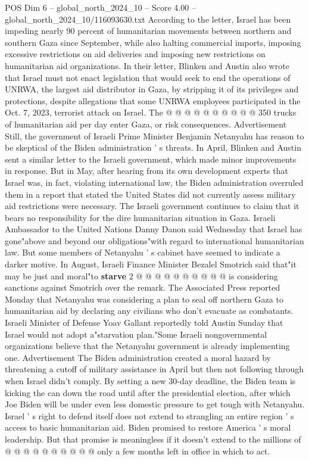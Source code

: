 \begin{textsample}{POS Dim 6 – global\_north\_2024\_10 – Score 4.00 – global\_north\_2024\_10/116093630.txt}
According to the letter, Israel has been impeding nearly 90 percent of humanitarian movements between northern and southern Gaza since September, while also halting commercial imports, imposing excessive restrictions on aid deliveries and imposing new restrictions on humanitarian aid organizations.
In their letter, Blinken and Austin also wrote that Israel must not enact legislation that would seek to end the operations of UNRWA, the largest aid distributor in Gaza, by stripping it of its privileges and protections, despite allegations that some UNRWA employees participated in the Oct. 7, 2023, terrorist attack on Israel.
The @ @ @ @ @ @ @ @ @ @ 350 trucks of humanitarian aid per day enter Gaza, or risk consequences.
Advertisement Still, the government of Israeli Prime Minister Benjamin Netanyahu has reason to be skeptical of the Biden administration ' s threats.
In April, Blinken and Austin sent a similar letter to the Israeli government, which made minor improvements in response.
But in May, after hearing from its own development experts that Israel was, in fact, violating international law, the Biden administration overruled them in a report that stated the United States did not currently assess military aid restrictions were necessary.
The Israeli government continues to claim that it bears no responsibility for the dire humanitarian situation in Gaza.
Israeli Ambassador to the United Nations Danny Danon said Wednesday that Israel has gone"above and beyond our obligations"with regard to international humanitarian law.
But some members of Netanyahu ' s cabinet have seemed to indicate a darker motive.
In August, Israeli Finance Minister Bezalel Smotrich said that"it may be just and moral"to \textbf{starve} 2 @ @ @ @ @ @ @ @ @ @ is considering sanctions against Smotrich over the remark.
The Associated Press reported Monday that Netanyahu was considering a plan to seal off northern Gaza to humanitarian aid by declaring any civilians who don't evacuate as combatants.
Israeli Minister of Defense Yoav Gallant reportedly told Austin Sunday that Israel would not adopt a"starvation plan."Some Israeli nongovernmental organizations believe that the Netanyahu government is already implementing one.
Advertisement The Biden administration created a moral hazard by threatening a cutoff of military assistance in April but then not following through when Israel didn't comply.
By setting a new 30-day deadline, the Biden team is kicking the can down the road until after the presidential election, after which Joe Biden will be under even less domestic pressure to get tough with Netanyahu.
Israel ' s right to defend itself does not extend to strangling an entire region ' s access to basic humanitarian aid.
Biden promised to restore America ' s moral leadership.
But that promise is meaningless if it doesn't extend to the millions of @ @ @ @ @ @ @ @ @ @ only a few months left in office in which to act.

\end{textsample}
